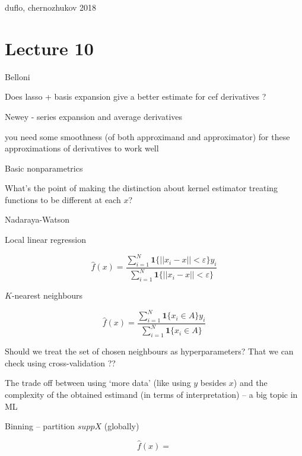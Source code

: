 \documentclass[a4paper,12pt,twoside]{article}
\begin{document}
duflo, chernozhukov 2018


\section*{Lecture 10}


Belloni

Does lasso + basis expansion give a better estimate for cef derivatives ?

Newey  - series expansion and average derivatives

you need some smoothness (of both approximand and approximator) for these approximations of derivatives to work well


Basic nonparametrics


What's the point of making the distinction about kernel estimator treating functions to be different at each $x$?



Nadaraya-Watson

Local linear regression

\begin{equation}
	\hat f(x) = \frac{\sum_{i = 1}^N \mathbf{1} \{ || x_i - x || < \varepsilon \} y_i }{\sum_{i = 1}^N \mathbf{1} \{ || x_i - x || < \varepsilon \}}
\end{equation}


$K$-nearest neighbours


\begin{equation}
	\hat f(x) = \frac{\sum_{i = 1}^N \mathbf{1} \{ x_i \in A \} y_i}{\sum_{i = 1}^N \mathbf{1} \{ x_i \in A \}}
\end{equation}

Should we treat the set of chosen neighbours as hyperparameters? That we can check using cross-validation ??


The trade off between using `more data' (like using $y$ besides $x$) and the complexity of the obtained estimand (in terms of interpretation) -- a big topic in ML


Binning -- partition $supp X$ (globally)

\begin{equation}
	\hat f (x) = 
\end{equation}
\end{document}
